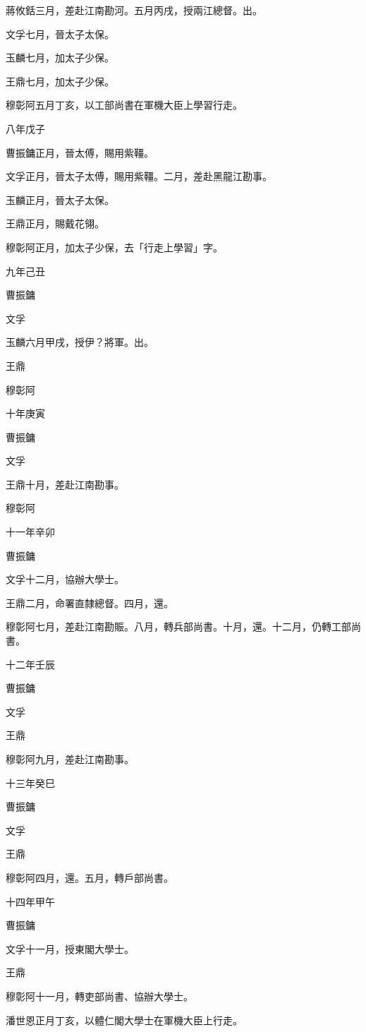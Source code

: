 \begin{pinyinscope}
蔣攸銛三月，差赴江南勘河。五月丙戌，授兩江總督。出。

文孚七月，晉太子太保。

玉麟七月，加太子少保。

王鼎七月，加太子少保。

穆彰阿五月丁亥，以工部尚書在軍機大臣上學習行走。

八年戊子

曹振鏞正月，晉太傅，賜用紫韁。

文孚正月，晉太子太傅，賜用紫韁。二月，差赴黑龍江勘事。

玉麟正月，晉太子太保。

王鼎正月，賜戴花翎。

穆彰阿正月，加太子少保，去「行走上學習」字。

九年己丑

曹振鏞

文孚

玉麟六月甲戌，授伊？將軍。出。

王鼎

穆彰阿

十年庚寅

曹振鏞

文孚

王鼎十月，差赴江南勘事。

穆彰阿

十一年辛卯

曹振鏞

文孚十二月，協辦大學士。

王鼎二月，命署直隸總督。四月，還。

穆彰阿七月，差赴江南勘賑。八月，轉兵部尚書。十月，還。十二月，仍轉工部尚書。

十二年壬辰

曹振鏞

文孚

王鼎

穆彰阿九月，差赴江南勘事。

十三年癸巳

曹振鏞

文孚

王鼎

穆彰阿四月，還。五月，轉戶部尚書。

十四年甲午

曹振鏞

文孚十一月，授東閣大學士。

王鼎

穆彰阿十一月，轉吏部尚書、協辦大學士。

潘世恩正月丁亥，以體仁閣大學士在軍機大臣上行走。


\end{pinyinscope}
